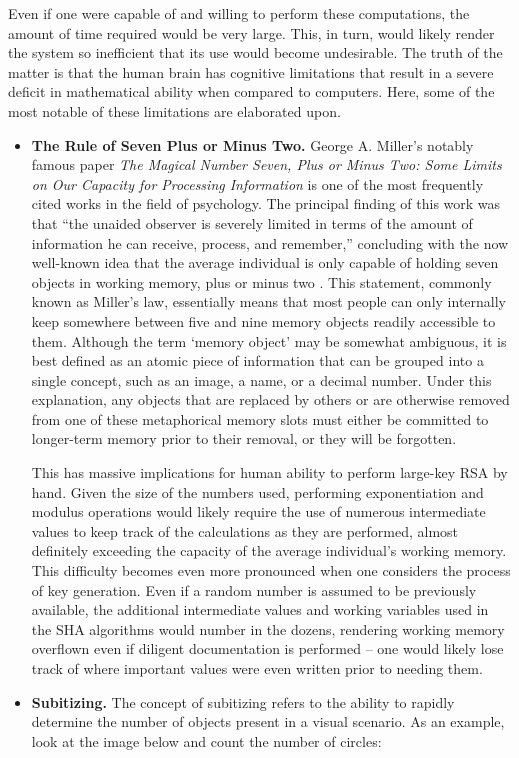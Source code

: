 \documentclass[11pt]{article}
\begin{document}
Even if one were capable of and willing to perform these computations, the amount of time required would be very large. This, in turn, would likely render the system so inefficient that its use would become undesirable. The truth of the matter is that the human brain has cognitive limitations that result in a severe deficit in mathematical ability when compared to computers. Here, some of the most notable of these limitations are elaborated upon.

\begin{itemize}
\item
{
\textbf{The Rule of Seven Plus or Minus Two.}
George A. Miller's notably famous paper \textit{The Magical Number Seven, Plus or Minus Two: Some Limits on Our Capacity for Processing Information} is one of the most frequently cited works in the field of psychology. The principal finding of this work was that ``the unaided observer is severely limited in terms of the amount of information he can receive, process, and remember,'' concluding with the now well-known idea that the average individual is only capable of holding seven objects in working memory, plus or minus two \cite{miller1956}. This statement, commonly known as Miller's law, essentially means that most people can only internally keep somewhere between five and nine memory objects readily accessible to them. Although the term `memory object' may be somewhat ambiguous, it is best defined as an atomic piece of information that can be grouped into a single concept, such as an image, a name, or a decimal number. Under this explanation, any objects that are replaced by others or are otherwise removed from one of these metaphorical memory slots must either be committed to longer-term memory prior to their removal, or they will be forgotten.

This has massive implications for human ability to perform large-key RSA by hand. Given the size of the numbers used, performing exponentiation and modulus operations would likely require the use of numerous intermediate values to keep track of the calculations as they are performed, almost definitely exceeding the capacity of the average individual's working memory. This difficulty becomes even more pronounced when one considers the process of key generation. Even if a random number is assumed to be previously available, the additional intermediate values and working variables used in the SHA algorithms would number in the dozens, rendering working memory overflown even if diligent documentation is performed -- one would likely lose track of where important values were even written prior to needing them.
}
\item{
\textbf{Subitizing.}
The concept of subitizing refers to the ability to rapidly determine the number of objects present in a visual scenario. As an example, look at the image below and count the number of circles:\newline

}
\end{itemize}
\end{document}
